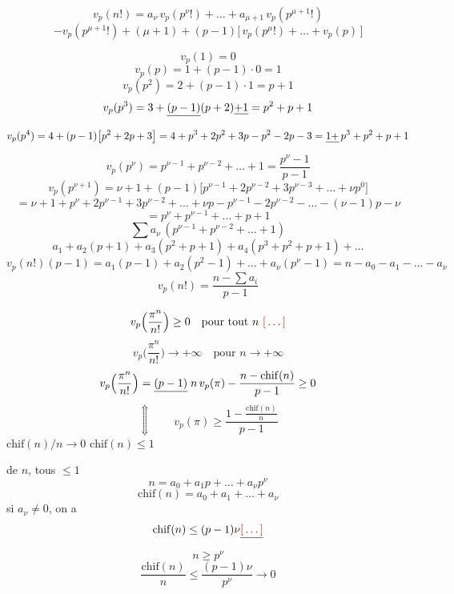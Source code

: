 \documentclass[11pt,a4paper]{article}
\begin{document}

\[
v_p(n!) = a_\nu\,v_p(p^{\nu}!) + \dots + a_{\mu+1}\,v_p(p^{\mu+1}!)
\]
\[
- v_p(p^{\mu+1}!) + (\mu+1) + (p-1)\big[\,v_p(p^{\mu}!) + \dots + v_p(p)\,\big]
\]

\[
v_p(1) = 0
\]
\[
v_p(p) = 1 + (p-1)\cdot 0 = 1
\]
\[
v_p(p^{2}) = 2 + (p-1)\cdot 1 = p+1
\]
\[
v_p(p^{3}) = 3 + \struck{(p-1)}(p+2)\struck{+1} = p^{2} + p + 1
\]
\[
v_p(p^{4}) = 4 + (p-1)\big[p^{2} + 2p + 3\big] = 4 + p^{3} + 2p^{2} + 3p - p^{2} - 2p - 3
= \struck{1+}\,p^{3} + p^{2} + p + 1
\]
\[
v_p(p^{\nu}) = p^{\nu-1} + p^{\nu-2} + \dots + 1 = \frac{p^{\nu} - 1}{p - 1}
\]
\[
v_p(p^{\nu+1}) = \nu + 1 + (p-1)\big[p^{\nu-1} + 2p^{\nu-2} + 3p^{\nu-3} + \dots + \nu p^{0}\big]
\]
\[
= \nu + 1 + p^{\nu} + 2p^{\nu-1} + 3p^{\nu-2} + \dots + \nu p
- p^{\nu-1} - 2p^{\nu-2} - \dots - (\nu-1)p - \nu
\]
\[
= p^{\nu} + p^{\nu-1} + \dots + p + 1
\]
\[
\sum a_\nu\,(p^{\nu-1} + p^{\nu-2} + \dots + 1)
\]
\[
a_1 + a_2(p+1) + a_3(p^{2} + p + 1) + a_4(p^{3} + p^{2} + p + 1) + \dots
\]
\[
v_p(n!)(p-1) = a_1(p-1) + a_2(p^{2}-1) + \dots + a_\nu(p^{\nu} - 1)
= n - a_0 - a_1 - \dots - a_\nu
\]
\[
\boxed{\;v_p(n!) = \frac{n - \sum a_i}{p - 1}\;}
\]


\[
v_p\Big(\frac{\pi^{n}}{n!}\Big) \geq 0 \quad \text{pour tout } n \ \ill{}
\]
\[
v_p\Big(\frac{\pi^{n}}{n!}\Big) \to +\infty \quad \text{pour } n \to +\infty
\]
\[
v_p\Big(\frac{\pi^{n}}{n!}\Big) = \struck{(p-1)}\; n\,v_p(\pi) - \frac{n - \mathrm{chif}(n)}{p-1} \geq 0
\]
\[
\Updownarrow \qquad v_p(\pi) \geq \frac{1 - \frac{\mathrm{chif}(n)}{n}}{p-1}
\]
 \quad $\mathrm{chif}(n)/n \to 0$ \quad
{} \quad
$\mathrm{chif}(n) \leq 1$

de $n$, tous $\leq 1$
\[
n = a_0 + a_1 p + \dots + a_\nu p^{\nu}
\]
\[
\mathrm{chif}(n) = a_0 + a_1 + \dots + a_\nu
\]
si $a_\nu \neq 0$, on a \ill{}
\[
\mathrm{chif}(n) \leq (p-1)\nu\struck{\ill{}}
\]
\[
n \geq p^{\nu}
\]
\[
\frac{\mathrm{chif}(n)}{n} \leq \frac{(p-1)\nu}{p^{\nu}} \to 0
\]
\end{document}
